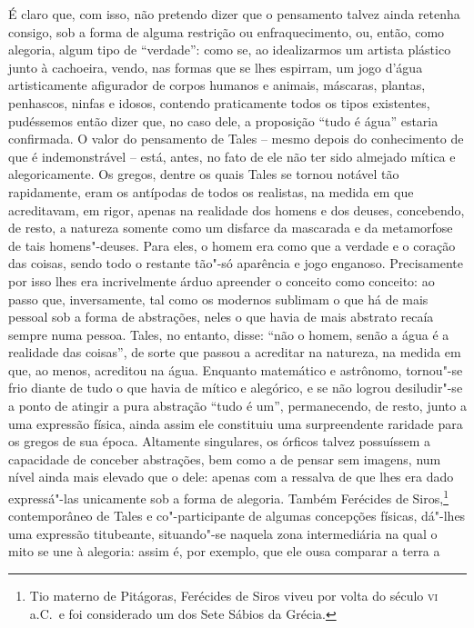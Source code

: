 É claro que, com isso, não pretendo dizer que o pensamento talvez ainda
retenha consigo, sob a forma de alguma restrição ou enfraquecimento,
ou, então, como alegoria, algum tipo de ``verdade'': como se, ao
idealizarmos um artista plástico junto à cachoeira, vendo, nas formas
que se lhes espirram, um jogo d'água artisticamente afigurador de
corpos humanos e animais, máscaras, plantas, penhascos, ninfas e
idosos, contendo praticamente todos os tipos existentes, pudéssemos
então dizer que, no caso dele, a proposição ``tudo é água'' estaria
confirmada. O valor do pensamento de Tales -- mesmo depois do		\label{pensamentodetales}
conhecimento de que é indemonstrável -- está, antes, no fato de ele não
ter sido almejado mítica e alegoricamente. Os gregos, dentre os quais
Tales se tornou notável tão rapidamente, eram os antípodas de todos os
realistas, na medida em que acreditavam, em rigor, apenas na realidade
dos homens e dos deuses, concebendo, de resto, a natureza somente como
um disfarce da mascarada e da metamorfose de tais homens"-deuses. Para
eles, o homem era como que a verdade e o coração das coisas, sendo todo
o restante tão"-só aparência e jogo enganoso. Precisamente por isso lhes
era incrivelmente árduo apreender o conceito como conceito: ao passo \label{incrivelmentearduo}
que, inversamente, tal como os modernos sublimam o que há de mais
pessoal sob a forma de abstrações, neles o que havia de mais abstrato
recaía sempre numa pessoa. Tales, no entanto, disse: ``não o homem,
senão a água é a realidade das coisas'', de sorte que passou a
acreditar na natureza, na medida em que, ao menos, acreditou na água.
Enquanto matemático e astrônomo, tornou"-se frio diante de tudo o que
havia de mítico e alegórico, e se não logrou desiludir"-se a ponto de
atingir a pura abstração ``tudo é um'', permanecendo, de resto, junto a
uma expressão física, ainda assim ele constituiu uma surpreendente
raridade para os gregos de sua época. Altamente singulares, os órficos
talvez possuíssem a capacidade de conceber abstrações, bem como a de
pensar sem imagens, num nível ainda mais elevado que o dele: apenas com
a ressalva de que lhes era dado expressá"-las unicamente sob a forma de
alegoria. Também Ferécides de Siros,\footnote{ Tio materno de
Pitágoras, Ferécides de Siros viveu por volta do século \textsc{vi} a.C.~e foi
considerado um dos Sete Sábios da Grécia.} contemporâneo de Tales
e co"-participante de algumas concepções físicas, dá"-lhes uma expressão
titubeante, situando"-se naquela zona intermediária na qual o mito se
une à alegoria: assim é, por exemplo, que ele ousa comparar a terra a
